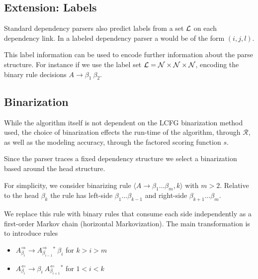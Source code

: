 \documentclass[11pt,letterpaper]{article}
\newcommand{\nonterms}{\mathcal{N}}
\newcommand{\rules}{\mathcal{R}}
\newcommand{\Rule}[3]{#1 \rightarrow #2\ #3}
\newcommand{\RuleA}[3]{#1 \rightarrow #2^*\ #3}
\newcommand{\RuleB}[3]{#1 \rightarrow #2\ #3^*}
\begin{document}




\subsection{Extension: Labels}


Standard dependency parsers also predict labels from a set ${\cal L}$ on each dependency link.
In a labeled dependency parser a would be of the form $(i, j, l)$.

This label information can be used to encode further information about the parse structure. For instance
if we use the label set ${\cal L} = \nonterms \times \nonterms \times \nonterms$, encoding the binary rule decisions $\Rule{A}{\beta_1}{\beta_2}$.


\subsection{Binarization}

While the algorithm itself is not dependent on the LCFG binarization
method used, the choice of binarization effects the run-time of the
algorithm, through $\rules$, as well as the modeling accuracy, through
the factored scoring function $s$.

Since the parser traces a fixed dependency structure
we select a binarization based around the head 
structure.

For simplicity, we consider binarizing rule $\langle A \rightarrow \beta_1 \ldots \beta_m,
k\rangle$ with $m > 2$. Relative to the head $\beta_k$
the rule has left-side $\beta_1 \ldots \beta_{k-1}$ and right-side
$\beta_{k+1} \ldots \beta_m$. 

We replace this rule with binary rules that consume each side
independently as a first-order Markov chain (horizontal Markovization). 
The main transformation is to introduce rules

\begin{itemize}

\item
$\RuleA{A^{\Rightarrow}_{\beta_i}}{A^{\Rightarrow}_{\beta_{i-1}}}{\beta_i}$ for $k > i > m$

\item
$\RuleB{A^{\Leftarrow}_{\beta_i}} {\beta_i}{A^{\Leftarrow}_{\beta_{i+1}}} $ for $1< i < k$
\end{itemize}  
\end{document}
